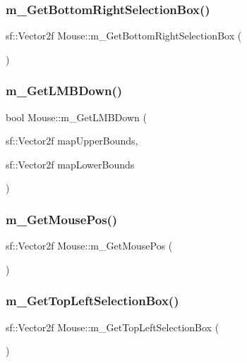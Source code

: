 \subsubsection{\texorpdfstring{m\+\_\+\+Get\+Bottom\+Right\+Selection\+Box()}{m\_GetBottomRightSelectionBox()}}
{\footnotesize\ttfamily sf\+::\+Vector2f Mouse\+::m\+\_\+\+Get\+Bottom\+Right\+Selection\+Box (\begin{DoxyParamCaption}{ }\end{DoxyParamCaption})}

\mbox{\label{class_mouse_aa80965ead15bff808a7ac925808fe2ef}} 
\subsubsection{\texorpdfstring{m\+\_\+\+Get\+L\+M\+B\+Down()}{m\_GetLMBDown()}}
{\footnotesize\ttfamily bool Mouse\+::m\+\_\+\+Get\+L\+M\+B\+Down (\begin{DoxyParamCaption}\item[{sf\+::\+Vector2f}]{map\+Upper\+Bounds,  }\item[{sf\+::\+Vector2f}]{map\+Lower\+Bounds }\end{DoxyParamCaption})}

\mbox{\label{class_mouse_a3cecb21e004a7543f862adeb1f99668f}} 
\subsubsection{\texorpdfstring{m\+\_\+\+Get\+Mouse\+Pos()}{m\_GetMousePos()}}
{\footnotesize\ttfamily sf\+::\+Vector2f Mouse\+::m\+\_\+\+Get\+Mouse\+Pos (\begin{DoxyParamCaption}{ }\end{DoxyParamCaption})}

\mbox{\label{class_mouse_a11ee7162a00ebdde0fd089189507a0a1}} 
\subsubsection{\texorpdfstring{m\+\_\+\+Get\+Top\+Left\+Selection\+Box()}{m\_GetTopLeftSelectionBox()}}
{\footnotesize\ttfamily sf\+::\+Vector2f Mouse\+::m\+\_\+\+Get\+Top\+Left\+Selection\+Box (\begin{DoxyParamCaption}{ }\end{DoxyParamCaption})}

